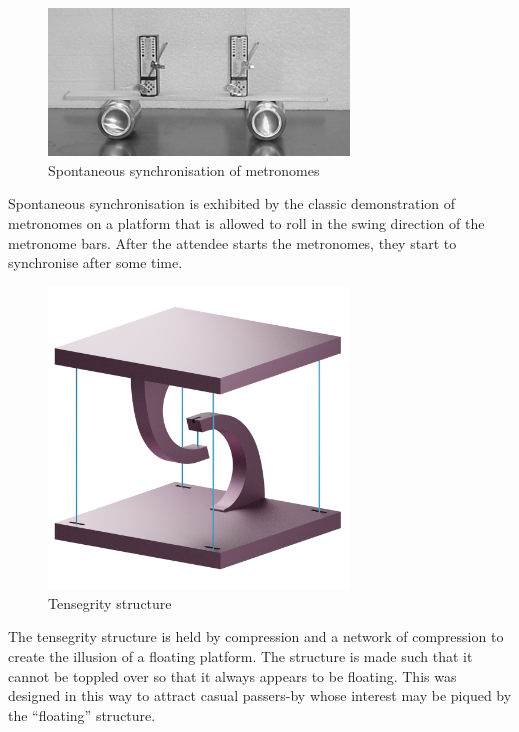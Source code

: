 \documentclass[12pt, a4paper]{article}
\begin{document}
\begin{figure}[H]
    \centering
    \includegraphics[width=8cm]{metronomes2.png}
    \caption{Spontaneous synchronisation of metronomes \cite{pantaleone_synchronization_2002}}
    \label{metronomes}
\end{figure}
Spontaneous synchronisation is exhibited by the classic demonstration of metronomes on a platform that is allowed to roll in the swing direction of the metronome bars. After the attendee starts the metronomes, they start to synchronise after some time.

\begin{figure}[H]
    \centering
    \includegraphics[width=8cm]{tensegrity.png}
    \caption{Tensegrity structure}
    \label{tensegrity}
\end{figure}
The tensegrity structure is held by compression and a network of compression to create the illusion of a floating platform. The structure is made such that it cannot be toppled over so that it always appears to be floating. This was designed in this way to attract casual passers-by whose interest may be piqued by the ``floating'' structure.
\end{document}
